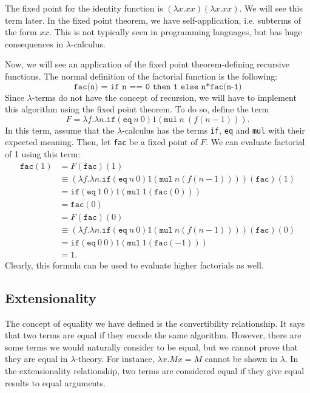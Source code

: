 \documentclass[a4paper, openany]{memoir}
\theoremstyle{definition}
\begin{document}
    The fixed point for the identity function is $(\lambda x.xx)(\lambda x.xx)$. We will see this term later. In the fixed point theorem, we have self-application, i.e. subterms of the form $xx$. This is not typically seen in programming languages, but has huge consequences in $\lambda$-calculus.

    Now, we will see an application of the fixed point theorem-defining recursive functions. The normal definition of the factorial function is the following:
    \[\texttt{fac(n) = if n == 0 then 1 else n*fac(n-1)}\]
    Since $\lambda$-terms do not have the concept of recursion, we will have to implement this algorithm using the fixed point theorem. To do so, define the term
    \[F = \lambda f.\lambda n.\texttt{if} (\texttt{eq} \ n \ 0) 1 (\texttt{mul} \ n \ (f(n-1))).\]
    In this term, assume that the $\lambda$-calculus has the terms \texttt{if}, \texttt{eq} and \texttt{mul} with their expected meaning. Then, let \texttt{fac} be a fixed point of $F$. We can evaluate factorial of 1 using this term:
    \begin{align*}
        \texttt{fac}(1) &= F(\texttt{fac})(1) \\
        &\equiv (\lambda f.\lambda n.\texttt{if} (\texttt{eq} \ n \ 0) 1 (\texttt{mul} \ n (f(n-1))))(\texttt{fac})(1) \\
        &= \texttt{if} (\texttt{eq} \ 1 \ 0) 1 (\texttt{mul} \ 1 (\texttt{fac}(0))) \\
        &= \texttt{fac}(0) \\
        &= F(\texttt{fac})(0) \\
        &\equiv (\lambda f.\lambda n.\texttt{if} (\texttt{eq} \ n \ 0) 1 (\texttt{mul} \ n (f(n-1))))(\texttt{fac})(0) \\
        &= \texttt{if} (\texttt{eq} \ 0 \ 0) 1 (\texttt{mul} \ 1 (\texttt{fac}(-1)))  \\
        &= 1.
    \end{align*}
    \noindent Clearly, this formula can be used to evaluate higher factorials as well.
    
    \subsection{Extensionality}
    The concept of equality we have defined is the convertibility relationship. It says that two terms are equal if they encode the same algorithm. However, there are some terms we would naturally consider to be equal, but we cannot prove that they are equal in $\lambda$-theory. For instance, $\lambda x.Mx = M$ cannot be shown in $\lambda$. In the extensionality relationship, two terms are considered equal if they give equal results to equal arguments.
\end{document}
